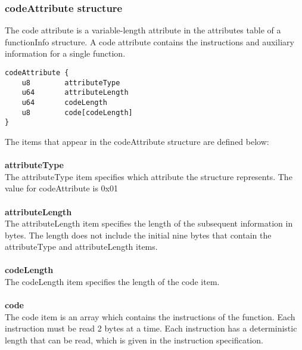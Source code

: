 \documentclass[12pt]{article}
\newcommand*{\formalfont}{\fontfamily{ptm}\selectfont}
\newcommand\tab[1][1cm]{\hspace*{#1}}
\begin{document}
			\subsubsection{codeAttribute structure}
			\label{sec:codeAttribute}
				The code attribute is a variable-length attribute in the attributes table of a functionInfo structure. A code attribute contains the instructions and auxiliary information for a single function.
			\begin{Verbatim}[frame=single]
codeAttribute {	
	u8        attributeType
	u64       attributeLength
	u64       codeLength
	u8        code[codeLength]
}
			\end{Verbatim}
			The items that appear in the {\formalfont codeAttribute} structure are defined below: \\ \\
			\textbf{attributeType} \\
				\tab The {\formalfont attributeType} item specifies which attribute the structure represents. The value for {\formalfont codeAttribute} is \colorbox{code}{0x01} \\ \\
			\textbf{attributeLength} \\
				\tab The {\formalfont attributeLength} item specifies the length of the subsequent information in bytes. The length does not include the initial nine bytes that contain the attributeType and attributeLength items. \\ \\
			\textbf{codeLength} \\
				\tab The {\formalfont codeLength} item specifies the length of the {\formalfont code} item. \\ \\
			\textbf{code} \\
				\tab The {\formalfont code} item is an array which contains the instructions of the function. Each instruction must be read 2 bytes at a time. Each instruction has a deterministic length that can be read, which is given in the instruction specification. 
						
	
\end{document}

